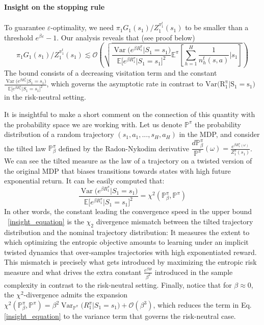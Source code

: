 \documentclass[final,12pt]{colt2026} %
\begin{document}
\paragraph{Insight on the stopping rule}\label{insight} To guarantee $\varepsilon$-optimality, we need $\pi_1 G_1(s_1)/Z_1^{\pi_1^t}(s_1)$ to be smaller than a threshold $e^{\beta \varepsilon} - 1$. Our analysis reveals that (see proof below)
\begin{equation}\label{insight_equation}
\pi_1 G_1(s_1)/Z_1^{\pi_1^t}(s_1) \lesssim \mathcal{O}\left( \sqrt{ \frac{\operatorname{Var}\Big(e^{\beta R_1^\pi}\big|S_1 = s_1\Big)}{\mathbb{E}\Big[e^{\beta R_1^\pi}\big|S_1 = s_1\Big]^2} \mathbb{E}^\pi\left[\sum_{h=1}^H \frac{1}{n_h^t(s,a)}\Bigg|s_1\right]}\right)\end{equation}
The bound consists of a decreasing visitation term and the constant
$
\tfrac{\operatorname{Var}\Big(e^{\beta R_1^\pi}\big|S_1 = s_1\Big)}{\mathbb{E}\Big[e^{\beta R_1^\pi}\big|S_1 = s_1\Big]^2}$,
which governs the asymptotic rate in contrast to $\operatorname{Var(R_1^\pi\big|S_1 = s_1})$ in the risk-neutral setting. 

It is insightful  to make a short comment on the connection of this quantity with the probability space we are working with. Let us denote $\mathbb{P}^\pi$  the probability distribution of a random trajectory $(s_1,a_1,...,s_H,a_H)$ in the MDP, and consider the tilted law $\mathbb{P}_\beta^\pi$ defined by the Radon-Nykodim derivative 
$\dfrac{d\mathbb{P}_\beta^\pi}{\mathbb{P}^\pi}(\omega) = \frac{e^{\beta R_1^\pi(\omega)}}{Z_1^\pi(s_1)}$. 
We can see the tilted measure as the law of a trajectory on a twisted version of the original MDP that biases transitions towards states with high future exponential return. It can be easily computed that:
$$\frac{\operatorname{Var}\Big(e^{\beta R_1^\pi}\big|S_1 = s_1\Big)}{\mathbb{E}\Big[e^{\beta R_1^\pi}\big|S_1 = s_1\Big]^2} = \chi^2(\mathbb{P}_\beta^\pi,\mathbb{P}^\pi)$$
In other words, the constant leading the convergence speed in the upper bound ~\eqref{insight_equation} is the $\chi_2$ divergence mismatch between the tilted trajectory distribution and the nominal trajectory distribution: It measures the extent to which optimizing the entropic objective amounts to learning under an implicit twisted dynamics that over-samples trajectories with high exponentiated reward. This mismatch is precisely what gets introduced by maximizing the entropic risk measure and what drives the extra constant $\frac{e^{\beta H}}{\beta^2}$ introduced in the sample complexity in contrast to the risk-neutral setting. 
Finally, notice that for $\beta \approx 0$, the $\chi^2$-divergence admits the expansion
$
\chi^2(\mathbb{P}_\beta^\pi , \mathbb{P}^\pi)
= \beta^2\operatorname{Var}_{\mathbb{P}^\pi}\big(R_1^\pi\big|S_1 = s_1\big) + \mathcal{O}(\beta^3)
$, which reduces the term in Eq.\eqref{insight_equation} to the variance term that governs the risk-neutral case.
\end{document}
